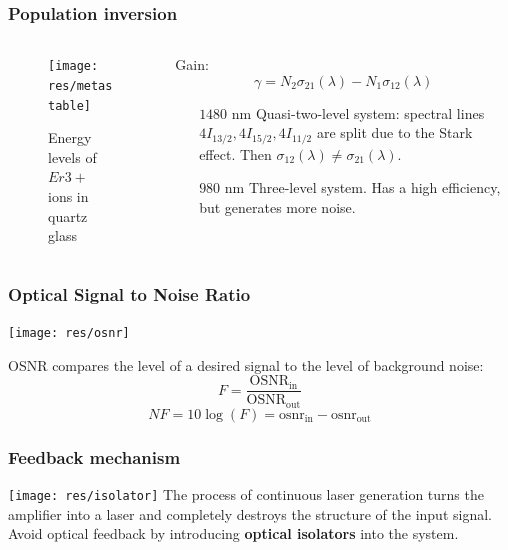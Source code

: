 \documentclass{beamer}
\begin{document}
	\begin{frame}
		\frametitle{Population inversion}		
		\begin{columns}
			\footnotesize
			\begin{column}{0.6\textwidth}
				\begin{figure}
					\footnotesize
					\centering
					\texttt{[image: res/metastable]}
					\vspace{-5pt}
					\footnotesize
					\caption{\footnotesize Energy levels of $Er3+$ ions in quartz glass}
				\end{figure}
			\end{column}
			\begin{column}{0.5\textwidth}
				Gain: 
				$$\gamma =  N_2\sigma_{21}(\lambda) -  N_1\sigma_{12}(\lambda)$$
				
				\begin{itemize}
					\item[$1480$ nm] Quasi-two-level system: spectral lines $4I_{13/2}, 4I_{15/2}, 4I_{11/2}$ are split due to the Stark effect. Then $\sigma_{12}(\lambda) \neq \sigma_{21}(\lambda)$.
					
					\item[$980$ nm] Three-level system. Has a high efficiency, but generates more noise.
				\end{itemize}				
			\end{column}
		\end{columns}	
	\end{frame}
	
	\begin{frame}
		\frametitle{Optical Signal to Noise Ratio}

		\texttt{[image: res/osnr]}
		\footnotesize
		
		OSNR compares the level of a desired signal to the level of background noise:
		$$F = \frac{\text{OSNR}_{\text{in}}}{\text{OSNR}_{\text{out}}}$$
		$$NF = 10\log{\left(F\right)} = \text{osnr}_{\text{in}} - \text{osnr}_{\text{out}}$$		
	
	\end{frame}

\begin{frame}
	\frametitle{Feedback mechanism}
	\texttt{[image: res/isolator]}
	\footnotesize
	The process of continuous laser generation turns the amplifier into a laser and completely destroys the structure of the input signal. Avoid optical feedback by introducing \textbf{optical isolators} into the system.
\end{frame}
\end{document}
